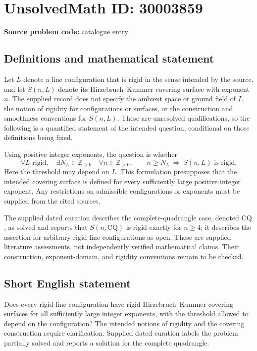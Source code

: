 \documentclass[11pt]{article}
\newcommand{\Z}{\mathbb{Z}}
\begin{document}
\section*{UnsolvedMath ID: 30003859}
\textbf{Source problem code:} catalogue entry
\subsection{Definitions and mathematical statement}
Let \(L\) denote a line configuration that is rigid in the sense intended by the source, and let \(S(n,L)\) denote its Hirzebruch--Kummer covering surface with exponent \(n\). The supplied record does not specify the ambient space or ground field of \(L\), the notion of rigidity for configurations or surfaces, or the construction and smoothness conventions for \(S(n,L)\). These are unresolved qualifications, so the following is a quantified statement of the intended question, conditional on those definitions being fixed.

Using positive integer exponents, the question is whether
\[
\forall L\text{ rigid},\quad
\exists N_L\in\Z_{>0}\quad
\forall n\in\Z_{>0},\qquad
n\geq N_L\ \Longrightarrow\ S(n,L)\text{ is rigid}.
\]
Here the threshold may depend on \(L\). This formulation presupposes that the intended covering surface is defined for every sufficiently large positive integer exponent. Any restrictions on admissible configurations or exponents must be supplied from the cited sources.

The supplied dated curation describes the complete-quadrangle case, denoted \(\mathrm{CQ}\), as solved and reports that \(S(n,\mathrm{CQ})\) is rigid exactly for \(n\geq4\); it describes the assertion for arbitrary rigid line configurations as open. These are supplied literature assessments, not independently verified mathematical claims. Their construction, exponent-domain, and rigidity conventions remain to be checked.
\subsection{Short English statement}
Does every rigid line configuration have rigid Hirzebruch--Kummer covering surfaces for all sufficiently large integer exponents, with the threshold allowed to depend on the configuration? The intended notions of rigidity and the covering construction require clarification. Supplied dated curation labels the problem partially solved and reports a solution for the complete quadrangle.
\end{document}
